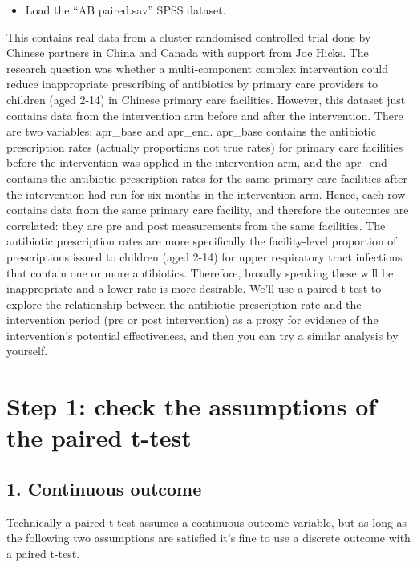 \documentclass[
]{book}
\providecommand{\tightlist}{%
  \setlength{\itemsep}{0pt}\setlength{\parskip}{0pt}}
\begin{document}
\begin{itemize}
\tightlist
\item
  Load the ``AB paired.sav'' SPSS dataset.
\end{itemize}

This contains real data from a cluster randomised controlled trial done by Chinese partners in China and Canada with support from Joe Hicks. The research question was whether a multi-component complex intervention could reduce inappropriate prescribing of antibiotics by primary care providers to children (aged 2-14) in Chinese primary care facilities. However, this dataset just contains data from the intervention arm before and after the intervention. There are two variables: apr\_base and apr\_end. apr\_base contains the antibiotic prescription rates (actually proportions not true rates) for primary care facilities before the intervention was applied in the intervention arm, and the apr\_end contains the antibiotic prescription rates for the same primary care facilities after the intervention had run for six months in the intervention arm. Hence, each row contains data from the same primary care facility, and therefore the outcomes are correlated: they are pre and post measurements from the same facilities. The antibiotic prescription rates are more specifically the facility-level proportion of prescriptions issued to children (aged 2-14) for upper respiratory tract infections that contain one or more antibiotics. Therefore, broadly speaking these will be inappropriate and a lower rate is more desirable. We'll use a paired t-test to explore the relationship between the antibiotic prescription rate and the intervention period (pre or post intervention) as a proxy for evidence of the intervention's potential effectiveness, and then you can try a similar analysis by yourself.

\hypertarget{step-1-check-the-assumptions-of-the-paired-t-test}{%
\section{Step 1: check the assumptions of the paired t-test}\label{step-1-check-the-assumptions-of-the-paired-t-test}}

\hypertarget{continuous-outcome-1}{%
\subsection{1. Continuous outcome}\label{continuous-outcome-1}}

Technically a paired t-test assumes a continuous outcome variable, but as long as the following two assumptions are satisfied it's fine to use a discrete outcome with a paired t-test.
\end{document}

